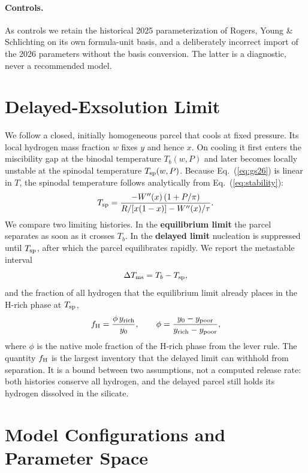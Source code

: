 \paragraph{Controls.} As controls we retain the historical 2025 parameterization of Rogers,
Young \& Schlichting \cite{rogers2025} on its own formula-unit basis, and a deliberately
incorrect import of the 2026 parameters without the basis conversion. The latter is a
diagnostic, never a recommended model.

\section{Delayed-Exsolution Limit}\label{sec:delayed}

We follow a closed, initially homogeneous parcel that cools at fixed pressure. Its local
hydrogen mass fraction $w$ fixes $y$ and hence $x$. On cooling it first enters the
miscibility gap at the binodal temperature $T_b(w,P)$ and later becomes locally unstable at
the spinodal temperature $T_{\rm sp}(w,P)$. Because Eq.~(\ref{eq:gs26}) is linear in $T$,
the spinodal temperature follows analytically from Eq.~(\ref{eq:stability}):
\begin{equation}
T_{\rm sp} = \frac{-W''(x)\,(1+P/\pi)}{R/[x(1-x)] - W''(x)/\tau}.
\label{eq:tsp}
\end{equation}
We compare two limiting histories. In the \textbf{equilibrium limit} the parcel separates as
soon as it crosses $T_b$. In the \textbf{delayed limit} nucleation is suppressed until
$T_{\rm sp}$, after which the parcel equilibrates rapidly. We report the metastable interval
\begin{equation}
\Delta T_{\rm ms} = T_b - T_{\rm sp},
\label{eq:interval}
\end{equation}
and the fraction of all hydrogen that the equilibrium limit already places in the H-rich
phase at $T_{\rm sp}$,
\begin{equation}
f_{\rm H} = \frac{\phi\, y_{\rm rich}}{y_0}, \qquad
\phi = \frac{y_0-y_{\rm poor}}{y_{\rm rich}-y_{\rm poor}},
\label{eq:fh}
\end{equation}
where $\phi$ is the native mole fraction of the H-rich phase from the lever rule. The quantity
$f_{\rm H}$ is the largest inventory that the delayed limit can withhold from separation. It is
a bound between two assumptions, not a computed release rate: both histories conserve all
hydrogen, and the delayed parcel still holds its hydrogen dissolved in the silicate.

\section{Model Configurations and Parameter Space}

